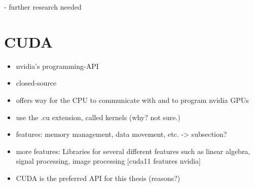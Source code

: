 - further research needed

\section{CUDA}
\begin{itemize}
\item nvidia's programming-API
\item closed-source
\item offers way for the CPU to communicate with and to program nvidia GPUs
\item use the .cu extension, called kernels (why? not sure.)
\item features: memory management, data movement, etc. -> subsection?
\item more features: Libraries for several different features such as linear algebra, signal processing, image processing [cuda11 features nvidia]
\item CUDA is the preferred API for this thesis (reasons?)
\end{itemize}


